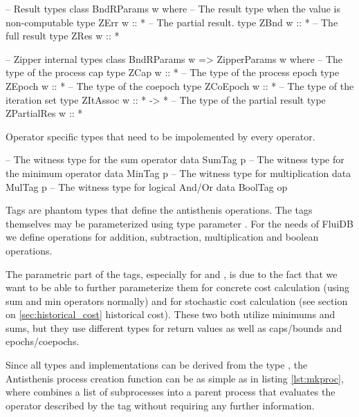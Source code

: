 \begin{code}
\begin{haskellcode}
-- Result types
class BndRParams w where
  -- The result type when the value is non-computable
  type ZErr w :: *
  -- The partial result.
  type ZBnd w :: *
  -- The full result
  type ZRes w :: *

-- Zipper internal types
class BndRParams w => ZipperParams w where
  -- The type of the process cap
  type ZCap w :: *
  -- The type of the process epoch
  type ZEpoch w :: *
  -- The type of the coepoch
  type ZCoEpoch w :: *
  -- The type of the iteration set
  type ZItAssoc w :: * -> *
  -- The type of the partial result
  type ZPartialRes w :: *
\end{haskellcode}
  \caption{\label{lst:zipper_params}Operator specific types that need
    to be impolemented by every operator.}
\end{code}

\begin{code}
\begin{haskellcode}
-- The witness type for the sum operator
data SumTag p
-- The witness type for the minimum operator
data MinTag p
-- The witness type for multiplication
data MulTag p
-- The witness type for logical And/Or
data BoolTag op
\end{haskellcode}
  \caption{\label{lst:tag_types}Tags are phantom types that define the
    antisthenis operations. The tags themselves may be parameterized
    using type parameter . For the needs of FluiDB we define
    operations for addition, subtraction, multiplication and boolean
    operations.}
\end{code}

The parametric part of the tags, especially for  and
, is due to the fact that we want to be able to further
parameterize them for concrete cost calculation (using sum and min
operators normally) and for stochastic cost calculation (see section
on \ref{sec:historical_cost} historical cost). These two both utilize
minimums and sums, but they use different types for return values as
well as caps/bounds and epochs/coepochs.

Since all types and implementations can be derived from the
 type , the Antisthenis process creation
function can be as simple as in listing \ref{lst:mkproc}, where
 combines a list of subprocesses into a parent process
that evaluates the operator described by the tag  without
requiring any further information.


